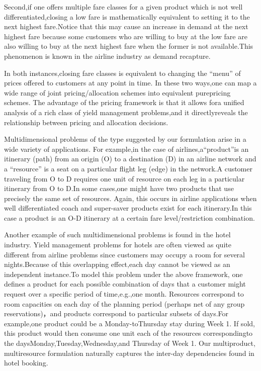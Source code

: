 Second,if one offers multiple fare classes for a given product which is
not well differentiated,closing a low fare is mathematically equivalent
to setting it to the next highest fare.Notice that this may cause an
increase in demand at the next highest fare because some customers who
are willing to buy at the low fare are also willing to buy at the next
highest fare when the former is not available.This phenomenon is known
in the airline industry as demand recapture.

In both instances,closing fare classes is equivalent to changing the
``menu'' of prices offered to customers at any point in time. In these
two ways,one can map a wide range of joint pricing/allocation schemes
into equivalent purepricing schemes. The advantage of the pricing
framework is that it allows fora unified analysis of a rich class of
yield management problems,and it directlyreveals the relationship
between pricing and allocation decisions.

Multidimensional problems of the type suggested by our formulation arise
in a wide variety of applications. For example,in the case of
airlines,a``product''is an itinerary (path) from an origin (O) to a
destination (D) in an airline network and a ``resource'' is a seat on a
particular flight leg (edge) in the network.A customer traveling from O
to D requires one unit of resource on each leg in a particular itinerary
from O to D.In some cases,one might have two products that use precisely
the same set of resources. Again, this occurs in airline applications
when well differentiated coach and super-saver products exist for each
itinerary.In this case a product is an O-D itinerary at a certain fare
level/restriction combination.

Another example of such multidimensional problems is found in the hotel
industry. Yield management problems for hotels are often viewed as quite
different from airline problems since customers may occupy a room for
several nights.Because of this overlapping effect,each day cannot be
viewed as an independent instance.To model this problem under the above
framework, one defines a product for each possible combination of days
that a customer might request over a specific period of time,e.g.,one
month. Resources correspond to room capacities on each day of the
planning period (perhaps net of any group reservations)，and products
correspond to particular subsets of days.For example,one product could
be a Monday-toThursday stay during Week 1. If sold, this product would
then consume one unit each of the resources correspondingto the
daysMonday,Tuesday,Wednesday,and Thursday of Week 1. Our multiproduct,
multiresource formulation naturally captures the inter-day dependencies
found in hotel booking.

